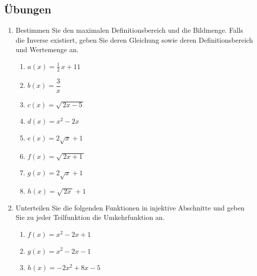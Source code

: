 \subsection{Übungen}
\begin{enumerate}
    \item Bestimmen Sie den maximalen Definitionsbereich und die Bildmenge.
          Falls die Inverse existiert, geben Sie deren Gleichung sowie deren
          Definitionsbereich und Wertemenge an.
          \begin{enumerate}
              \item $a(x)=\tfrac{1}{2}\,x+11$
              \item $b(x)=\dfrac{3}{x}$
              \item $c(x)=\sqrt{\,2x-5\,}$
              \item $d(x)=x^{2}-2x$
              \item $e(x)=2\sqrt{x}+1$
              \item $f(x)=\sqrt{\,2x+1\,}$
              \item $g(x)=2\sqrt{x}+1$
              \item $h(x)=\sqrt{\,2x\,}+1$
          \end{enumerate}

    \item Unterteilen Sie die folgenden Funktionen in injektive Abschnitte und geben
          Sie zu jeder Teilfunktion die Umkehrfunktion an.
          \begin{enumerate}
              \item $f(x)=x^{2}-2x+1$
              \item $g(x)=x^{2}-2x-1$
              \item $h(x)=-2x^{2}+8x-5$
          \end{enumerate}
\end{enumerate}
\newpage
